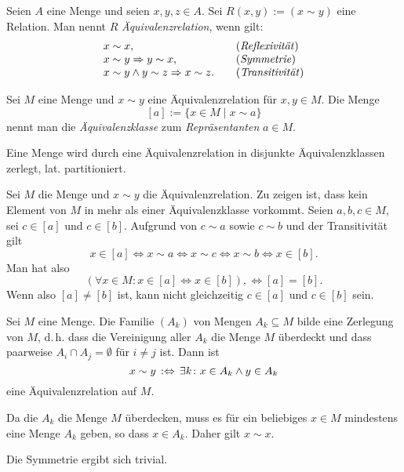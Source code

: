 \begin{Definition}[Äquivalenzrelation]\newlinefirst
Seien $A$ eine Menge und seien $x,y,z\in A$. Sei $R(x,y):=(x\sim y)$ eine
Relation. Man nennt $R$ \emph{Äquivalenzrelation}, wenn gilt:
\[\begin{array}{ll}
x\sim x, &\text{(\emph{Reflexivität})}\\
x\sim y \Rightarrow y\sim x, & \text{(\emph{Symmetrie})}\\
x\sim y\land y\sim z\Rightarrow x\sim z.\quad & \text{(\emph{Transitivität})}
\end{array}\]
\end{Definition}

\begin{Definition}[Äquivalenzklasse]\newlinefirst
Sei $M$ eine Menge und $x\sim y$ eine Äquivalenzrelation für $x,y\in M$.
Die Menge%
\[[a] := \{x\in M\mid x\sim a\}\]
nennt man die \emph{Äquivalenzklasse} zum \emph{Repräsentanten} $a\in M$.
\end{Definition}

\begin{Satz}\newlinefirst
Eine Menge wird durch eine Äquivalenzrelation in disjunkte
Äquivalenzklassen zerlegt, lat. partitioniert.
\end{Satz}
 Sei $M$ die Menge und $x\sim y$ die Äquivalenzrelation.
Zu zeigen ist, dass kein Element von $M$ in mehr als einer
Äquivalenzklasse vorkommt. Seien $a,b,c\in M$, sei $c\in [a]$
und $c\in [b]$. Aufgrund von $c\sim a$ sowie $c\sim b$ und der
Transitivität gilt%
\[x\in [a]\iff x\sim a\iff x\sim c\iff x\sim b\iff x\in [b].\]
Man hat also
\[(\forall x\in M\colon x\in [a]\Leftrightarrow x\in [b]),\iff [a]=[b].\]
Wenn also $[a]\ne [b]$ ist, kann nicht gleichzeitig $c\in [a]$ und $c\in [b]$
sein.\;\qedsymbol

\begin{Satz}\newlinefirst
Sei $M$ eine Menge. Die Familie $(A_k)$ von Mengen $A_k\subseteq M$
bilde eine Zerlegung von $M$, d.\,h. dass die Vereinigung aller
$A_k$ die Menge $M$ überdeckt und dass paarweise $A_i\cap A_j=\emptyset$
für $i\ne j$ ist. Dann ist%
\[x\sim y\, :\Leftrightarrow\, \exists k\colon x\in A_k\land y\in A_k\]
eine Äquivalenzrelation auf $M$.
\end{Satz}
 Da die $A_k$ die Menge $M$ überdecken,
muss es für ein beliebiges $x\in M$ mindestens eine Menge $A_k$
geben, so dass $x\in A_k$. Daher gilt $x\sim x$.

Die Symmetrie ergibt sich trivial.

